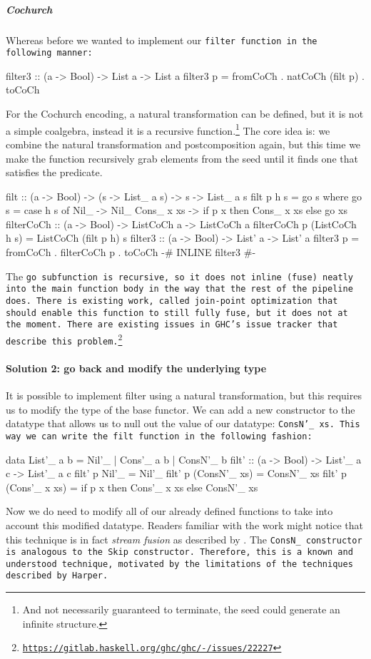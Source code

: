 \subparagraph{Cochurch}
Whereas before we wanted to implement our \tt{filter} function in the following manner:
\begin{spec}
filter3 :: (a -> Bool) -> List a -> List a
filter3 p = fromCoCh . natCoCh (filt p) . toCoCh
\end{spec}
For the Cochurch encoding, a natural transformation can be defined, but it is not a simple coalgebra, instead it is a recursive function.\footnote{And not necessarily guaranteed to terminate, the seed could generate an infinite structure.}
The core idea is: we combine the natural transformation and postcomposition again, but this time we make the function recursively grab elements from the seed until it finds one that satisfies the predicate.
\begin{code}
filt :: (a -> Bool) -> (s -> List_ a s) -> s -> List_ a s
filt p h s = go s
  where go s = case h s of
          Nil_ -> Nil_
          Cons_ x xs -> if p x then Cons_ x xs else go xs
filterCoCh :: (a -> Bool) -> ListCoCh a -> ListCoCh a
filterCoCh p (ListCoCh h s) = ListCoCh (filt p h) s
filter3 :: (a -> Bool) -> List' a -> List' a
filter3 p = fromCoCh . filterCoCh p . toCoCh
{-# INLINE filter3 #-}
\end{code}
The \tt{go} subfunction is recursive, so it does not inline (fuse) neatly into the main function body in the way that the rest of the pipeline does.
There is existing work, called join-point optimization that should enable this function to still fully fuse, but it does not at the moment.
There are existing issues in GHC's issue tracker that describe this problem.\footnote{\url{https://gitlab.haskell.org/ghc/ghc/-/issues/22227}}


\paragraph{Solution 2: go back and modify the underlying type}
It is possible to implement filter using a natural transformation, but this requires us to modify the type of the base functor.
We can add a new constructor to the datatype that allows us to null out the value of our datatype: \tt{ConsN'\_ xs}.
This way we can write the \tt{filt} function in the following fashion:
\begin{code}
data List'_ a b = Nil'_ | Cons'_ a b | ConsN'_ b
filt' :: (a -> Bool) -> List'_ a c -> List'_ a c
filt' p Nil'_ = Nil'_
filt' p (ConsN'_ xs) = ConsN'_ xs
filt' p (Cons'_ x xs) = if p x then Cons'_ x xs else ConsN'_ xs
\end{code}
Now we do need to modify all of our already defined functions to take into account this modified datatype.
Readers familiar with the work might notice that this technique is in fact \textit{stream fusion} as described by \cite{Coutts2007}.
The \tt{ConsN\_} constructor is analogous to the \tt{Skip} constructor.
Therefore, this is a known and understood technique, motivated by the limitations of the techniques described by Harper.

